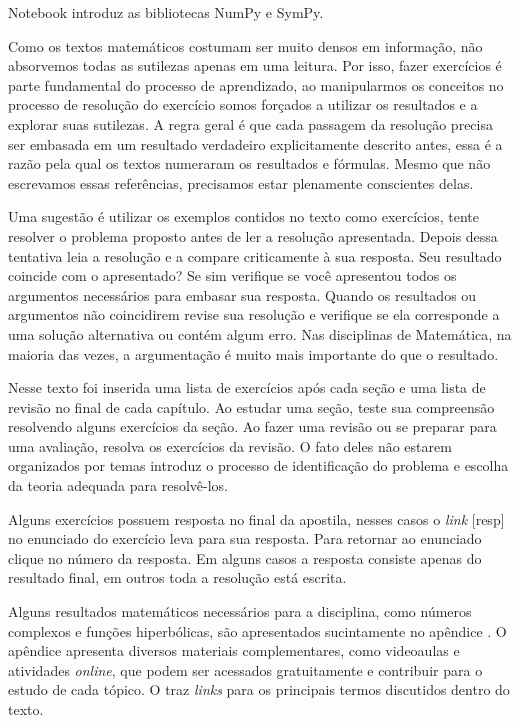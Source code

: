 {
  Notebook introduz as bibliotecas NumPy e SymPy.
}

Como os textos matemáticos costumam ser muito densos em informação,
não absorvemos todas as sutilezas apenas em uma leitura. Por isso, fazer exercícios é
parte fundamental do processo de aprendizado, ao manipularmos os conceitos no processo
de resolução do exercício somos forçados a utilizar os resultados e a explorar suas
sutilezas. A regra geral é que cada passagem da resolução precisa ser embasada em um
resultado verdadeiro explicitamente descrito antes, essa é a razão pela qual os textos
numeraram os resultados e fórmulas. Mesmo que não escrevamos essas referências,
precisamos estar plenamente conscientes delas.

Uma sugestão é utilizar os exemplos contidos no texto como exercícios, tente resolver
o problema proposto antes de ler a resolução apresentada. Depois dessa tentativa leia
a resolução e a compare criticamente à sua resposta.
Seu resultado coincide com o apresentado? Se sim verifique se você apresentou todos os
argumentos necessários para embasar sua resposta.
Quando os resultados ou argumentos não coincidirem revise
sua resolução e verifique se ela corresponde a uma solução alternativa ou contém
algum erro. Nas disciplinas de Matemática, na maioria das vezes, a argumentação
é muito mais importante do que o resultado.

Nesse texto foi inserida uma lista de exercícios após cada seção e uma lista de revisão
no final de cada capítulo. Ao estudar uma seção, teste sua compreensão resolvendo alguns
exercícios da seção. Ao fazer uma revisão ou se preparar para uma avaliação, resolva
os exercícios da revisão. O fato deles não estarem organizados por temas introduz o
processo de identificação do problema e escolha da teoria adequada para resolvê-los.

Alguns exercícios possuem resposta no final da apostila, nesses casos o
\textit{link} \textcolor{cpLinks}{[resp]} no enunciado do exercício
leva para sua resposta. Para retornar ao enunciado clique no número da resposta.
Em alguns casos a resposta consiste apenas do resultado final, em outros toda a
resolução está escrita.

Alguns resultados matemáticos necessários para a disciplina, como números complexos e
funções hiperbólicas, são apresentados sucintamente no apêndice
.
O apêndice  apresenta diversos materiais complementares,
como videoaulas e atividades \textit{online}, que podem ser acessados gratuitamente
e contribuir para o estudo de cada tópico.
O  traz \textit{links} para os principais termos
discutidos dentro do texto.

